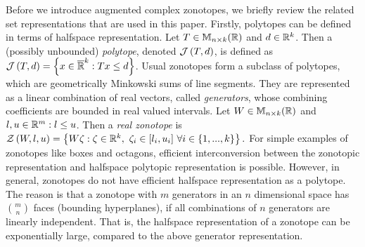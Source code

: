 
Before we introduce augmented complex zonotopes, we briefly review the
related set representations that are used in this paper.  Firstly,
polytopes can be defined in terms of halfspace representation.
%
Let $T\in\mathbb{M}_{n\times k}(\mathbb{\mathbb{R}})$ and $d\in\mathbb{R}^k$.  Then a (possibly
unbounded) \emph{polytope}, denoted $\mathcal{J}\left(T,d\right)$, is defined as
$\mathcal{J}\left(T,d\right) = \left\{x\in\mathbb{\overline{R}}^k: Tx\leq d\right\}$.
%
Usual zonotopes form a subclass of polytopes, which are geometrically
Minkowski sums of line segments. They are represented as a linear
combination of real vectors, called \emph{generators}, whose combining
coefficients are bounded in real valued intervals.
Let $W\in\mathbb{M}_{n\times k}(\mathbb{\mathbb{R}})$ and $l,u\in\mathbb{R}^m: l\leq u$.  Then 
 a \emph{real zonotope} is
$\mathcal{Z}\left(W,l,u\right) = \left\{W\zeta: \zeta\in\mathbb{R}^k,~\zeta_i\in[l_i,u_i]~\forall i\in \{1,...,k\}\right\}.$
%
For simple examples of zonotopes like boxes and octagons, efficient
interconversion between the zonotopic representation and halfspace
polytopic representation is possible.  However, in general, zonotopes
do not have efficient halfspace representation as a polytope.  The
reason is that a zonotope with $m$ generators in an $n$ dimensional
space has ${m}\choose{n}$ faces (bounding hyperplanes), if all
combinations of $n$ generators are linearly independent.  That is, the
halfspace representation of a zonotope can be exponentially large,
compared to the above generator representation.

